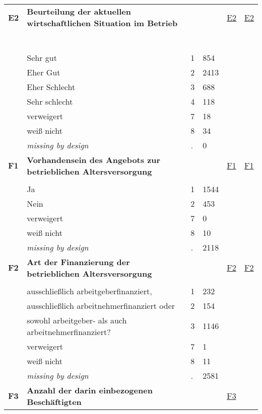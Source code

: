 \begin{longtable}{| L{2.45cm} | L{6cm} | C{1.5cm} | R{1cm} | C{2.25cm} | C{2.25cm} |}
\textbf{E2}\label{var:E2} & \textbf{Beurteilung der aktuellen wirtschaftlichen Situation im Betrieb} &  &  & \hyperref[E2]{E2} & \hyperref[var:suf:E2]{E2} \\ 
   & \protect\subsection[Variablen E2 bis ORDER07\_I3]{} &  &  &  &  \\ 
   & Sehr gut & 1 & 854 &  &  \\ 
   & Eher Gut & 2 & 2413 &  &  \\ 
   & Eher Schlecht & 3 & 688 &  &  \\ 
   & Sehr schlecht & 4 & 118 &  &  \\ 
   & verweigert & 7 & 18 &  &  \\ 
   & weiß nicht & 8 & 34 &  &  \\ 
   & \textit{missing by design} & \textit{.} & 0 &  &  \\ 
   \midrule
\textbf{F1}\label{var:F1} & \textbf{Vorhandensein des Angebots zur betrieblichen Altersversorgung} &  &  & \hyperref[F1]{F1} & \hyperref[var:suf:F1]{F1} \\ 
   &  &  &  &  &  \\ 
   & Ja & 1 & 1544 &  &  \\ 
   & Nein & 2 & 453 &  &  \\ 
   & verweigert & 7 & 0 &  &  \\ 
   & weiß nicht & 8 & 10 &  &  \\ 
   & \textit{missing by design} & \textit{.} & 2118 &  &  \\ 
   \midrule
\textbf{F2}\label{var:F2} & \textbf{Art der Finanzierung der betrieblichen Altersversorgung} &  &  & \hyperref[F2]{F2} & \hyperref[var:suf:F2]{F2} \\ 
   &  &  &  &  &  \\ 
   & ausschließlich arbeitgeberfinanziert, & 1 & 232 &  &  \\ 
   & ausschließlich arbeitnehmerfinanziert oder & 2 & 154 &  &  \\ 
   & sowohl arbeitgeber- als auch arbeitnehmerfinanziert? & 3 & 1146 &  &  \\ 
   & verweigert & 7 & 1 &  &  \\ 
   & weiß nicht & 8 & 11 &  &  \\ 
   & \textit{missing by design} & \textit{.} & 2581 &  &  \\ 
   \midrule
\textbf{F3}\label{var:F3} & \textbf{Anzahl der darin einbezogenen Beschäftigten} &  &  & \hyperref[F3]{F3} & \hyperref[var:suf:]{} \\ 

\end{longtable}
